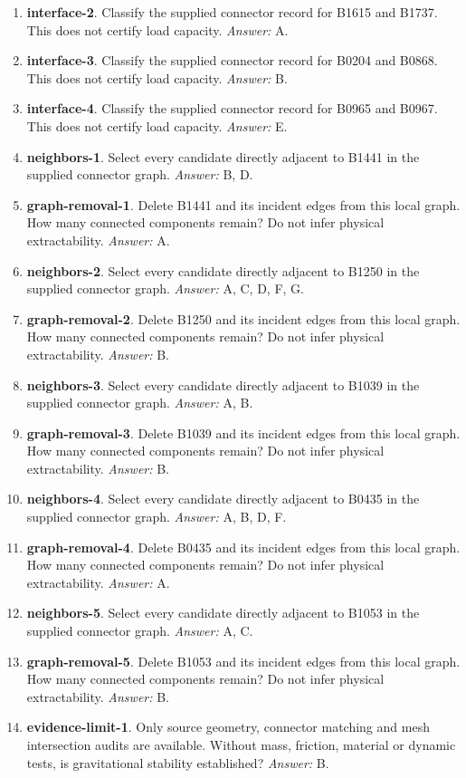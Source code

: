\begin{enumerate}
\item \textbf{interface-2}. Classify the supplied connector record for B1615 and B1737. This does not certify load capacity. \textit{Answer:} A.
\item \textbf{interface-3}. Classify the supplied connector record for B0204 and B0868. This does not certify load capacity. \textit{Answer:} B.
\item \textbf{interface-4}. Classify the supplied connector record for B0965 and B0967. This does not certify load capacity. \textit{Answer:} E.
\item \textbf{neighbors-1}. Select every candidate directly adjacent to B1441 in the supplied connector graph. \textit{Answer:} B, D.
\item \textbf{graph-removal-1}. Delete B1441 and its incident edges from this local graph. How many connected components remain? Do not infer physical extractability. \textit{Answer:} A.
\item \textbf{neighbors-2}. Select every candidate directly adjacent to B1250 in the supplied connector graph. \textit{Answer:} A, C, D, F, G.
\item \textbf{graph-removal-2}. Delete B1250 and its incident edges from this local graph. How many connected components remain? Do not infer physical extractability. \textit{Answer:} B.
\item \textbf{neighbors-3}. Select every candidate directly adjacent to B1039 in the supplied connector graph. \textit{Answer:} A, B.
\item \textbf{graph-removal-3}. Delete B1039 and its incident edges from this local graph. How many connected components remain? Do not infer physical extractability. \textit{Answer:} B.
\item \textbf{neighbors-4}. Select every candidate directly adjacent to B0435 in the supplied connector graph. \textit{Answer:} A, B, D, F.
\item \textbf{graph-removal-4}. Delete B0435 and its incident edges from this local graph. How many connected components remain? Do not infer physical extractability. \textit{Answer:} A.
\item \textbf{neighbors-5}. Select every candidate directly adjacent to B1053 in the supplied connector graph. \textit{Answer:} A, C.
\item \textbf{graph-removal-5}. Delete B1053 and its incident edges from this local graph. How many connected components remain? Do not infer physical extractability. \textit{Answer:} B.
\item \textbf{evidence-limit-1}. Only source geometry, connector matching and mesh intersection audits are available. Without mass, friction, material or dynamic tests, is gravitational stability established? \textit{Answer:} B.

\end{enumerate}
